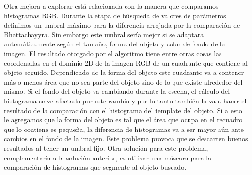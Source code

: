 Otra mejora a explorar está relacionada con la manera que comparamos histogramas RGB. Durante la etapa de búsqueda de valores de parámetros definimos un umbral máximo para la diferencia arrojada por la comparación de Bhattachayyra. Sin embargo este umbral sería mejor si se adaptara automáticamente según el tamaño, forma del objeto y color de fondo de la imagen. El resultado otorgado por el algoritmo tiene entre otras cosas las coordenadas en el dominio 2D de la imagen RGB de un cuadrante que contiene al objeto seguido. Dependiendo de la forma del objeto este cuadrante va a contener más o menos área que no sea parte del objeto sino de lo que existe alrededor del mismo. Si el fondo del objeto va cambiando durante la escena, el cálculo del histograma se ve afectado por este cambio y por lo tanto también lo va a hacer el resultado de la comparación con el histograma del template del objeto. Si a esto le agregamos que la forma del objeto es tal que el área que ocupa en el recuadro que lo contiene es pequeña, la diferencia de histogramas va a ser mayor aún ante cambios en el fondo de la imagen. Este problema provoca que se descarten buenos resultados al tener un umbral fijo. Otra solución para este problema, complementaria a la solución anterior, es utilizar una máscara para la comparación de histogramas que segmente al objeto buscado.
